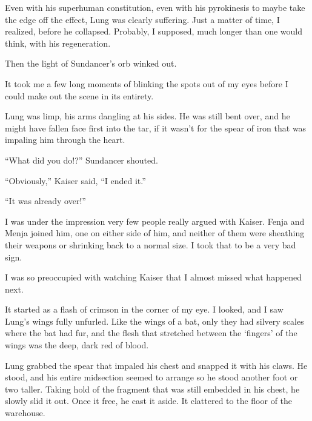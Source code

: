 Even with his superhuman constitution, even with his pyrokinesis to maybe take the edge off the effect, Lung was clearly suffering.  Just a matter of time, I realized, before he collapsed.  Probably, I supposed, much longer than one would think, with his regeneration.



Then the light of Sundancer's orb winked out.



It took me a few long moments of blinking the spots out of my eyes before I could make out the scene in its entirety.



Lung was limp, his arms dangling at his sides.  He was still bent over, and he might have fallen face first into the tar, if it wasn't for the spear of iron that was impaling him through the heart.



``What did you do!?'' Sundancer shouted.



``Obviously,'' Kaiser said, ``I ended it.''



``It was already over!''



I was under the impression very few people really argued with Kaiser.  Fenja and Menja joined him, one on either side of him, and neither of them were sheathing their weapons or shrinking back to a normal size.  I took that to be a very bad sign.



I was so preoccupied with watching Kaiser that I almost missed what happened next.



It started as a flash of crimson in the corner of my eye.  I looked, and I saw Lung's wings fully unfurled.  Like the wings of a bat, only they had silvery scales where the bat had fur, and the flesh that stretched between the `fingers' of the wings was the deep, dark red of blood.



Lung grabbed the spear that impaled his chest and snapped it with his claws.  He stood, and his entire midsection seemed to arrange so he stood another foot or two taller.  Taking hold of the fragment that was still embedded in his chest, he slowly slid it out.  Once it free, he cast it aside.  It clattered to the floor of the warehouse.



